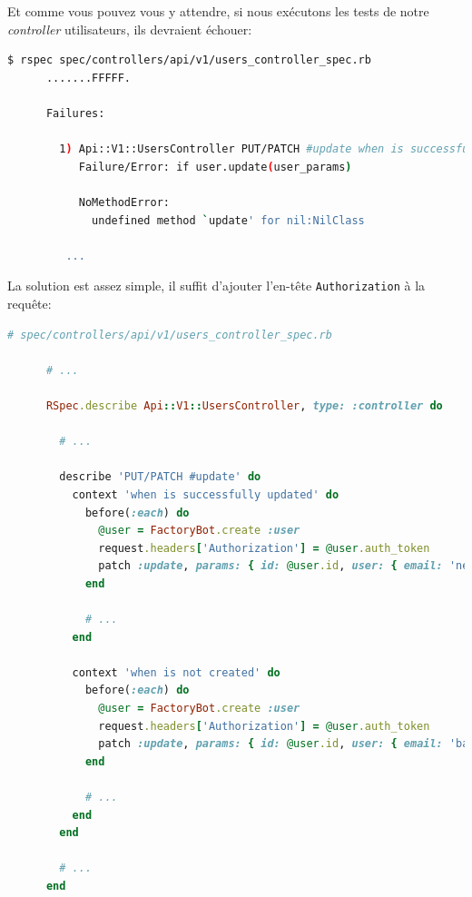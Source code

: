 \documentclass[]{report}
\begin{document}
    Et comme vous pouvez vous y attendre, si nous exécutons les tests de notre \textit{controller} utilisateurs, ils devraient échouer:

    \begin{scriptsize}
      \begin{lstlisting}[language=bash]
      $ rspec spec/controllers/api/v1/users_controller_spec.rb
      .......FFFFF.

      Failures:

        1) Api::V1::UsersController PUT/PATCH #update when is successfully updated renders the json representation for the updated user
           Failure/Error: if user.update(user_params)

           NoMethodError:
             undefined method `update' for nil:NilClass

         ...
      \end{lstlisting}
    \end{scriptsize}

    La solution est assez simple, il suffit d'ajouter l'en-tête \verb|Authorization| à la requête:

    \begin{scriptsize}
      \begin{lstlisting}[language=ruby]
      # spec/controllers/api/v1/users_controller_spec.rb

      # ...

      RSpec.describe Api::V1::UsersController, type: :controller do

        # ...

        describe 'PUT/PATCH #update' do
          context 'when is successfully updated' do
            before(:each) do
              @user = FactoryBot.create :user
              request.headers['Authorization'] = @user.auth_token
              patch :update, params: { id: @user.id, user: { email: 'newmail@example.com' } }, format: :json
            end

            # ...
          end

          context 'when is not created' do
            before(:each) do
              @user = FactoryBot.create :user
              request.headers['Authorization'] = @user.auth_token
              patch :update, params: { id: @user.id, user: { email: 'bademail.com' } }, format: :json
            end

            # ...
          end
        end

        # ...
      end
      \end{lstlisting}
    \end{scriptsize}
\end{document}
